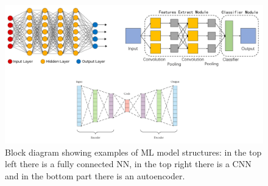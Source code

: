 \documentclass[12pt]{report}
\begin{document}
\begin{figure}[h!]
    \centering
    \includegraphics[width=140mm]{Figures/Chapter1/structures.png} 
    \caption{Block diagram showing examples of ML model structures: in the top left there is a fully connected NN, in the top right there is a CNN and in the bottom part there is an autoencoder.}
    \label{fig:structures}    
\end{figure}  
\end{document}
